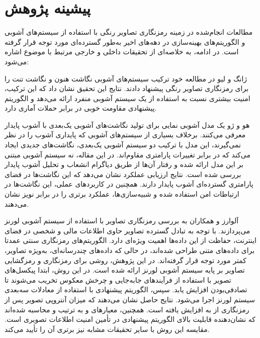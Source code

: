 \section{پیشینه پژوهش}

مطالعات انجام‌شده در زمینه رمزنگاری تصاویر رنگی با استفاده از سیستم‌های آشوبی و الگوریتم‌های بهینه‌سازی در دهه‌های اخیر به‌طور گسترده‌ای مورد توجه قرار گرفته است. در ادامه، به خلاصه‌ای از  تحقیقات داخلی و خارجی مرتبط با موضوع اشاره می‌شود:

ژانگ و لیو\cite{ref3} در مطالعه خود ترکیب سیستم‌های آشوبی نگاشت هنون و نگاشت تنت را برای رمزنگاری تصاویر رنگی پیشنهاد دادند. نتایج این تحقیق نشان داد که این ترکیب، امنیت بیشتری نسبت به استفاده از یک سیستم آشوبی منفرد ارائه می‌دهد و الگوریتم پیشنهادی مقاومت خوبی در برابر حملات آماری دارد.

هو و ژو \cite{ref4} یک مدل آشوبی نمایی برای تولید نگاشت‌های آشوبی یک‌بعدی با آشوب پایدار معرفی می‌کنند. برخلاف بسیاری از سیستم‌های آشوبی که پایداری آشوب را در نظر نمی‌گیرند، این مدل با ترکیب دو سیستم آشوبی یک‌بعدی، نگاشت‌های جدیدی ایجاد می‌کند که در برابر تغییرات پارامتری مقاوم‌اند. در این مقاله، نه سیستم آشوبی مبتنی بر این مدل ارائه شده و رفتار آن‌ها از طریق دیاگرام انشعاب و تحلیل آشوب پایدار بررسی شده است. نتایج ارزیابی عملکرد نشان می‌دهد که این نگاشت‌ها در فضای پارامتری گسترده‌ای آشوب پایدار دارند. همچنین در کاربردهای عملی، این نگاشت‌ها در ارتباطات امن استفاده شده و شبیه‌سازی‌ها، عملکرد برتری را در برابر نویز نشان می‌دهند.

آلوارز و همکاران \cite{ref6} به بررسی رمزنگاری تصاویر با استفاده از سیستم آشوبی لورنز می‌پردازند. با توجه به تبادل گسترده تصاویر حاوی اطلاعات مالی و شخصی در فضای اینترنت، حفاظت از این داده‌ها اهمیت ویژه‌ای دارد. الگوریتم‌های رمزنگاری سنتی عمدتا برای داده‌های متنی طراحی شده‌اند، در حالی که داده‌های چندرسانه‌ای، به‌ویژه تصاویر، کمتر مورد توجه قرار گرفته‌اند. در این پژوهش، روشی برای رمزنگاری و رمزگشایی تصاویر بر پایه سیستم آشوبی لورنز ارائه شده است. در این روش، ابتدا پیکسل‌های تصویر با استفاده از فرآیندهای جابه‌جایی و چرخش معکوس تخریب می‌شوند تا تصادفی‌بودن افزایش یابد. سپس، الگوریتم پیشنهادی با استفاده از معادلات سه‌بعدی سیستم لورنز اجرا می‌شود. نتایج حاصل نشان می‌دهند که میزان آنتروپی تصویر پس از رمزنگاری از  به  افزایش یافته است. همچنین، معیارهای  و  به ترتیب  و  محاسبه شده‌اند که نشان‌دهنده قابلیت بالای الگوریتم پیشنهادی در تأمین امنیت اطلاعات تصویری است. مقایسه این روش با سایر تحقیقات مشابه نیز برتری آن را تأیید می‌کند.

